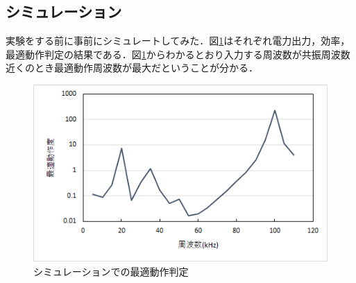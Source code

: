\documentclass[10pt,a4paper,twocolumn]{jarticle}
\begin{document}
\subsection{シミュレーション}
実験をする前に事前にシミュレートしてみた．図\ref{fig:simudousa}はそれぞれ電力出力，効率，最適動作判定の結果である．図\ref{fig:simudousa}からわかるとおり入力する周波数が共振周波数近くのとき最適動作周波数が最大だということが分かる．
\begin{figure}[h]
	\centering
	\includegraphics[scale=0.4]{saitekidousasimu.png}
	\caption{シミュレーションでの最適動作判定}
	\label{fig:simudousa}
\end{figure}
\end{document}
